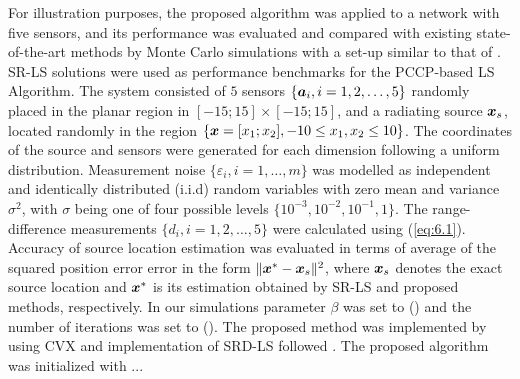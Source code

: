 For illustration purposes, the proposed algorithm was applied to a network with five sensors, and its performance was evaluated and compared with existing state-of-the-art methods by Monte Carlo simulations with a set-up similar to that of \cite{BeckStLi}. SR-LS solutions were used as performance benchmarks for the PCCP-based LS Algorithm. The system consisted of $5$ sensors $\{\mbox{\boldmath$a$}_i, i = 1, 2,\ldots,5\}$ randomly placed in the planar region in $[-15;15]\times[-15;15]$, and a radiating source $\mbox{\boldmath$x$}_s$, located randomly in the region $\{\mbox{\boldmath$x$}=[x_1;x_2], -10\leq x_1,x_2\leq 10\}$. The coordinates of the source and sensors were generated for each dimension following a uniform distribution. Measurement noise $\{\varepsilon_i, i=1,\ldots,m\}$ was modelled as independent and identically distributed (i.i.d) random variables with zero mean and variance $\sigma^2$, with $\sigma$ being one of four possible levels $\{10^{-3}, 10^{-2}, 10^{-1}, 1\}$.  The range-difference measurements $\{d_i, i=1, 2,\ldots,5\}$ were calculated using (\ref{eq:6.1}). Accuracy of source location estimation was evaluated in terms of average of the squared position error error in the form $\|\mbox{\boldmath$x$}^*-\mbox{\boldmath$x$}_s\|^2$, where $\mbox{\boldmath$x$}_s$ denotes the exact source location and $\mbox{\boldmath$x$}^*$ is its estimation obtained by SR-LS and proposed methods, respectively.  
In our simulations parameter $\beta$ was set to () and the number of iterations was set to (). The proposed method was implemented by using  CVX  \cite{cvx} and implementation of SRD-LS followed \cite{BeckStLi}. The proposed algorithm was initialized with ...  


